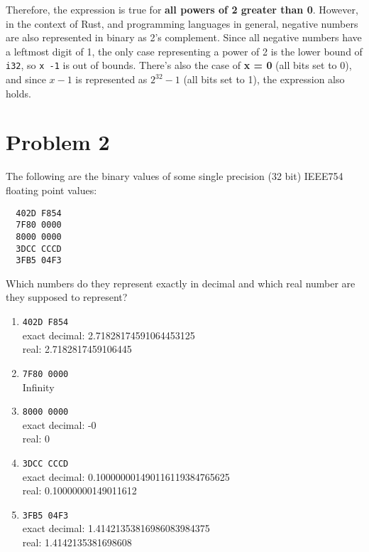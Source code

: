 \documentclass{article}
\begin{document}
Therefore, the expression is true for \textbf{all powers of 2 greater than 0}. However, in the context of Rust, and programming languages in general, negative numbers are also represented in binary as 2's complement. Since all negative numbers have a leftmost digit of 1, the only case representing a power of 2 is the lower bound of \verb|i32|, so \verb|x -1| is out of bounds. There's also the case of \textbf{x = 0} (all bits set to 0), and since $x - 1$ is represented as $2^{32} - 1$ (all bits set to 1), the expression also holds.

\section*{Problem 2}

The following are the binary values of some single precision (32 bit) IEEE754 floating point values:

\begin{verbatim}
  402D F854
  7F80 0000
  8000 0000
  3DCC CCCD
  3FB5 04F3
\end{verbatim}


Which numbers do they represent exactly in decimal and which real number are they supposed to
represent?

\begin{enumerate}
  \item \verb|402D F854| \\
        exact decimal: 2.71828174591064453125 \\
        real: 2.7182817459106445
  \item \verb|7F80 0000| \\
        Infinity
  \item \verb|8000 0000| \\
        exact decimal: -0 \\
        real: 0
  \item \verb|3DCC CCCD| \\
        exact decimal: 0.100000001490116119384765625 \\
        real: 0.10000000149011612
  \item \verb|3FB5 04F3| \\
        exact decimal: 1.41421353816986083984375 \\
        real: 1.4142135381698608
\end{enumerate}
\end{document}
